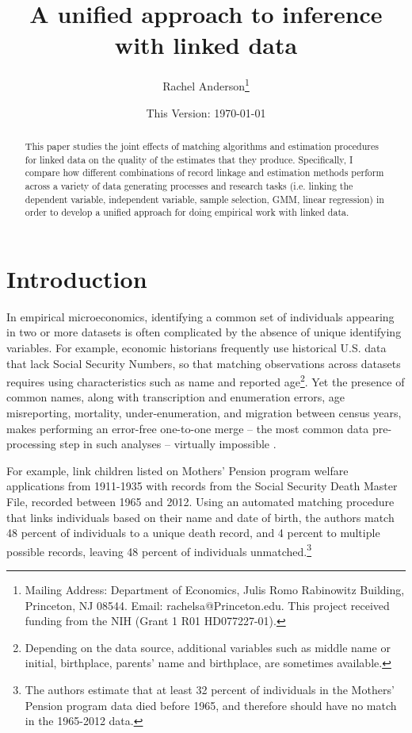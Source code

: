 \documentclass[12pt]{article}
\title{\singlespacing A unified approach to inference with linked data}
\author{Rachel Anderson\thanks{Mailing Address: Department of Economics, Julis Romo Rabinowitz Building,
Princeton, NJ 08544. Email: rachelsa@Princeton.edu.
This project received funding from the NIH (Grant 1 R01 HD077227-01). }}
\date{This Version: \today}
\begin{document}
\maketitle


\begin{abstract}
\singlespacing
\noindent This paper studies the joint effects of matching algorithms and estimation procedures for linked data on the quality of the estimates that they produce.  Specifically, I compare how different combinations of record linkage and estimation methods perform across a variety of data generating processes and research tasks (i.e. linking the dependent variable, independent variable, sample selection, GMM, linear regression) in order to develop a unified approach for doing empirical work with linked data.  \end{abstract}

\section{Introduction}
In empirical microeconomics, identifying a common set of individuals appearing in two or more datasets is often complicated by the absence of unique identifying variables.   For example, economic historians frequently use historical U.S. data that lack Social Security Numbers, so that matching observations across datasets requires using characteristics such as name and reported age\footnote{Depending on the data source, additional variables such as middle name or initial, birthplace, parents' name and birthplace, are sometimes available.}.  Yet the presence of common names, along with transcription and enumeration errors, age misreporting, mortality, under-enumeration, and migration between census years, makes performing an error-free one-to-one merge -- the most common data pre-processing step in such analyses -- virtually impossible \citep{abe2019}.

For example, \cite{aizer2016} link children listed on Mothers' Pension program welfare applications from 1911-1935 with records from the Social Security Death Master File, recorded between 1965 and 2012.  Using an automated matching procedure that links individuals based on their name and date of birth, the authors match 48 percent of individuals to a unique death record, and 4 percent to multiple possible records, leaving 48 percent of individuals unmatched.\footnote{The authors estimate that at least 32 percent of individuals in the Mothers' Pension program data died before 1965, and therefore should have no match in the 1965-2012 data.}  
\end{document}

